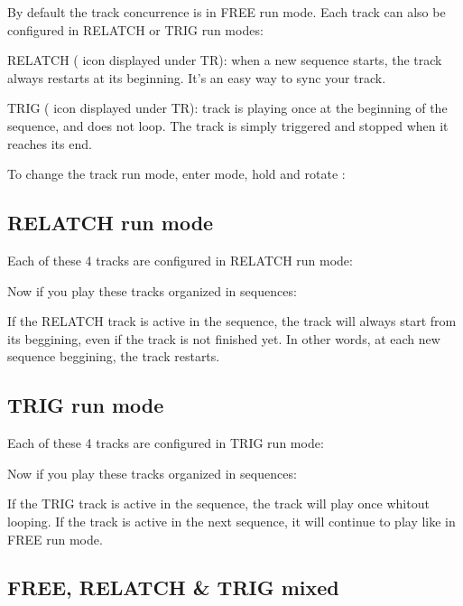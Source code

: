 By default the track concurrence is in FREE run mode. Each track can also be configured in RELATCH or TRIG run modes:

RELATCH ( icon displayed under TR): when a new sequence starts, the track always restarts at its beginning. It's an easy way to sync your track.

TRIG ( icon displayed under TR): track is playing once at the beginning of the sequence, and does not loop. The track is simply triggered and stopped when it reaches its end.

To change the track run mode, enter  mode, hold  and rotate \encodericon{}:




\subsection{RELATCH run mode}

Each of these 4 tracks are configured in RELATCH run mode:


Now if you play these tracks organized in sequences:


If the RELATCH track is active in the sequence, the track will always start from its beggining, even if the track is not finished yet. In other words, at each new sequence beggining, the track restarts.


\subsection{TRIG run mode}

Each of these 4 tracks are configured in TRIG run mode:


Now if you play these tracks organized in sequences:


If the TRIG track is active in the sequence, the track will play once whitout looping. If the track is active in the next sequence, it will continue to play like in FREE run mode.


\subsection{FREE, RELATCH \& TRIG mixed}

